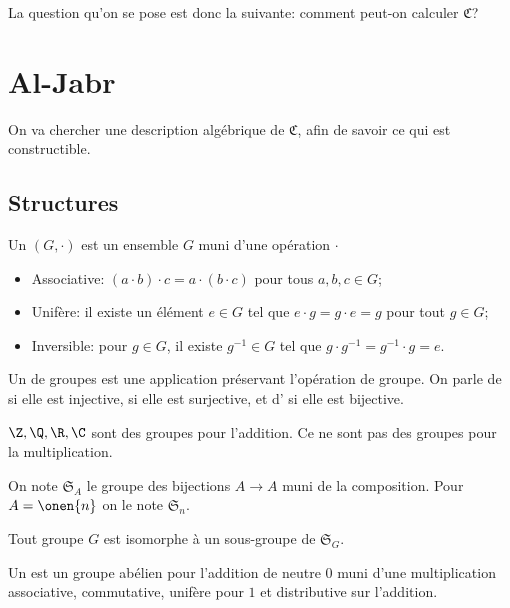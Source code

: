 \documentclass[math, info]{mpb-cours}
\def\fC{\mathfrak{C}}
\def\fS{\mathfrak{S}}
\begin{document}
La question qu'on se pose est donc la suivante: comment peut-on calculer $\fC$?

\section{Al-Jabr}
On va chercher une description algébrique de $\fC$, afin de savoir ce qui est constructible.

\subsection{Structures}

\begin{definition}
	Un  $(G, \cdot)$ est un ensemble $G$ muni d'une opération $\cdot$
	\begin{itemize}
		\item Associative: $(a\cdot b) \cdot c = a \cdot (b \cdot c)$ pour tous $a, b, c \in G$;
		\item Unifère: il existe un élément $e \in G$ tel que $e \cdot g = g \cdot e = g$ pour tout $g \in G$;
		\item Inversible: pour $g \in G$, il existe $g^{-1} \in G$ tel que $g \cdot g^{-1} = g^{-1}\cdot g = e$.
	\end{itemize}
	Un  de groupes est une application préservant l'opération de groupe.
	On parle de  si elle est injective,  si elle est surjective, et
	d' si elle est bijective.
\end{definition}

\begin{exemple}
	$\Z, \Q, \R, \C$ sont des groupes pour l'addition. Ce ne sont pas des groupes pour la multiplication.

	On note $\fS_{A}$ le groupe des bijections $A \to A$ muni de la composition. Pour $A = \onen{n}$ on le
	note $\fS_{n}$.
\end{exemple}

\begin{thm}[Cayley]
	Tout groupe $G$ est isomorphe à un sous-groupe de $\fS_{G}$.
\end{thm}

\begin{definition}
	Un  est un groupe abélien pour l'addition de neutre $0$ muni d'une multiplication
	associative, commutative, unifère pour $1$ et distributive sur l'addition.
\end{definition}
\end{document}
